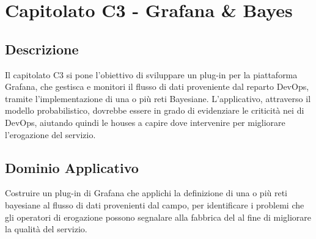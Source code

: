 \clearpage
\section{Capitolato C3 - Grafana \& Bayes}
\label{sec:c3}
\subsection{Descrizione}
Il capitolato C3 si pone l'obiettivo di sviluppare un plug-in per la piattaforma Grafana, che gestisca e monitori il flusso di dati proveniente dal reparto DevOps, tramite l'implementazione di una o più reti Bayesiane. 
L'applicativo, attraverso il modello probabilistico, dovrebbe essere in grado di evidenziare le criticità nei  di DevOps, aiutando quindi le  houses a capire dove intervenire per migliorare l'erogazione del servizio.

\subsection{Dominio Applicativo}
Costruire un plug-in di Grafana che applichi la definizione di una o più reti bayesiane al flusso di dati provenienti dal campo, per identificare i problemi che gli operatori di erogazione possono segnalare alla fabbrica del  al fine di migliorare la qualità del servizio.

